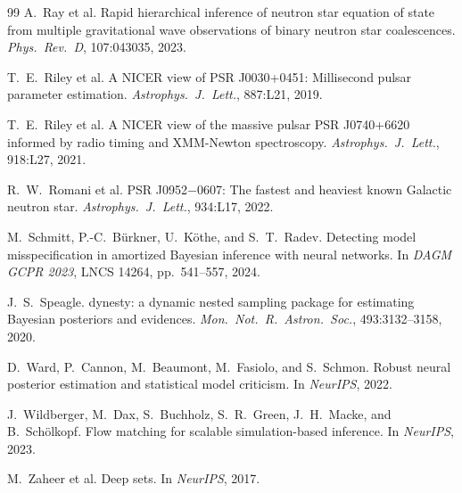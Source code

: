 \documentclass{article}
\begin{document}
\begin{thebibliography}{99}
 A.~Ray et al. Rapid hierarchical inference of neutron star equation of state from multiple gravitational wave observations of binary neutron star coalescences. \emph{Phys.\ Rev.\ D}, 107:043035, 2023.

 T.~E.~Riley et al. A NICER view of PSR J0030+0451: Millisecond pulsar parameter estimation. \emph{Astrophys.\ J.\ Lett.}, 887:L21, 2019.

 T.~E.~Riley et al. A NICER view of the massive pulsar PSR J0740+6620 informed by radio timing and XMM-Newton spectroscopy. \emph{Astrophys.\ J.\ Lett.}, 918:L27, 2021.

 R.~W.~Romani et al. PSR J0952$-$0607: The fastest and heaviest known Galactic neutron star. \emph{Astrophys.\ J.\ Lett.}, 934:L17, 2022.

 M.~Schmitt, P.-C.~B\"urkner, U.~K\"othe, and S.~T.~Radev. Detecting model misspecification in amortized Bayesian inference with neural networks. In \emph{DAGM GCPR 2023}, LNCS 14264, pp.\ 541--557, 2024.

 J.~S.~Speagle. dynesty: a dynamic nested sampling package for estimating Bayesian posteriors and evidences. \emph{Mon.\ Not.\ R.\ Astron.\ Soc.}, 493:3132--3158, 2020.

 D.~Ward, P.~Cannon, M.~Beaumont, M.~Fasiolo, and S.~Schmon. Robust neural posterior estimation and statistical model criticism. In \emph{NeurIPS}, 2022.

 J.~Wildberger, M.~Dax, S.~Buchholz, S.~R.~Green, J.~H.~Macke, and B.~Sch\"olkopf. Flow matching for scalable simulation-based inference. In \emph{NeurIPS}, 2023.

 M.~Zaheer et al. Deep sets. In \emph{NeurIPS}, 2017.

\end{thebibliography}
\end{document}

